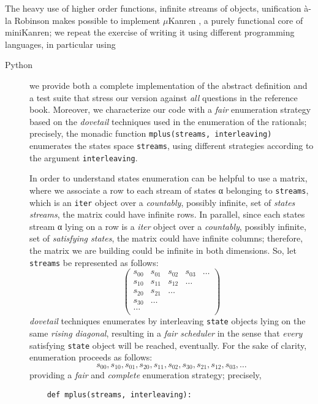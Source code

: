 The heavy use of higher order functions, infinite streams of objects,
unification \`a-la Robinson makes possible to implement $\mu$Kanren
\citep{Hemann:muKanren}, a purely functional core of miniKanren; we repeat the
exercise of writing it using different programming languages, in particular using
\begin{description}
\item[Python] 
    we provide both a complete implementation of the abstract definition and a
    test suite that stress our version against \textit{all} questions in the
    reference book. Moreover, we characterize our code with a \textit{fair}
    enumeration strategy based on the \textit{dovetail} techniques used in the
    enumeration of the rationals; precisely, the monadic function
    \verb|mplus(streams, interleaving)| enumerates the states space
    \verb|streams|, using different strategies according to the argument
    \verb|interleaving|.

    In order to understand states enumeration can be helpful to use a matrix,
    where we associate a row to each stream of states α belonging to
    \verb|streams|, which is an \verb|iter| object over a \textit{countably},
    possibly infinite, set of \textit{states streams}, the matrix could have infinite
    rows.  In parallel, since each states stream α lying on a row is a \textit{iter}
    object over a \textit{countably}, possibly infinite, set of \textit{satisfying states}, the
    matrix could have infinite columns; therefore, the matrix we are building
    could be infinite in both dimensions. So, let \verb|streams| be represented as follows:
    \begin{displaymath}
        \left(\begin{array}{ccccc}        
        s_{00} & s_{01} & s_{02} & s_{03} & \ldots \\
        s_{10} & s_{11} & s_{12} & \ldots &        \\
        s_{20} & s_{21} & \ldots &        &        \\
        s_{30} & \ldots &        &        &        \\
        \ldots &        &        &        &        \\
        \end{array}\right)
    \end{displaymath}
    \textit{dovetail} techniques enumerates by interleaving \verb|state|
    objects lying on the same \textit{rising diagonal}, resulting in a
    \textit{fair scheduler} in the sense that \textit{every} satisfying
    \verb|state| object will be reached, eventually. For the sake of clarity,
    enumeration proceeds as follows: 
    \begin{displaymath}
    s_{00}, s_{10}, s_{01}, s_{20}, s_{11}, s_{02}, s_{30}, s_{21},
    s_{12}, s_{03}, \ldots
    \end{displaymath}
    providing a \textit{fair} and \textit{complete} enumeration strategy;
    precisely,
    \begin{verbatim}
    def mplus(streams, interleaving):
        

\end{verbatim}
\end{description}
